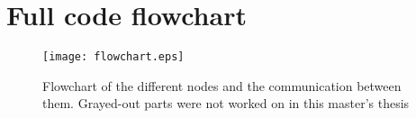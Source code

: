 \chapter{Full code flowchart}\label{app:flowchart}
\begin{figure}[H]
\centering
\texttt{[image: flowchart.eps]}
\caption{Flowchart of the different nodes and the communication between them. Grayed-out parts were not worked on in this master's thesis}
\label{fig:fullflowchart}
\end{figure}
